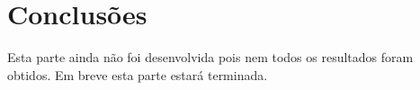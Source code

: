 \newpage\section{Conclusões}

Esta parte ainda não foi desenvolvida pois nem todos os resultados foram obtidos.
Em breve esta parte estará terminada.
